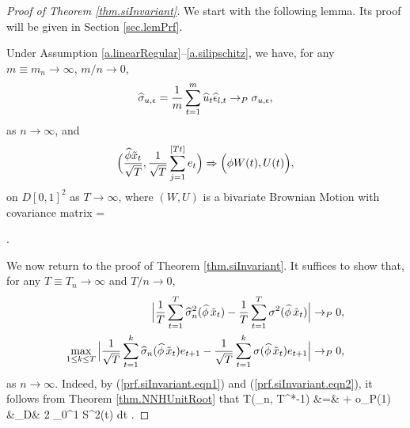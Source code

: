 \begin{proof}[Proof of Theorem \ref {thm.siInvariant}] 

We start with the following lemma. Its proof will be given in Section \ref{sec.lemPrf}.
\begin{lem} 
Under Assumption \ref{a.linearRegular}--\ref{a.silipschitz}, we have, for any $m \equiv m_n\to \infty$, $m / n \to 0$,
\begin{equation}\la{prop.covConsistent.eqn1}
\widehat{\si}_{u, \ep} = \frac{1}{m} \sum_{t = 1}^m \widehat{u}_t \widehat{\ep}_{l,t} \rightarrow_P \si_{u, \ep},
\end{equation}
as $n \to \infty$, and
\begin{equation}\la{prop.covConsistent.eqn2}
\Big ( \frac{\widehat{\phi}\tilde{x}_t}{\sqrt{T}}, \frac{1}{ \sqrt{T}} \sum_{j = 1}^{[Tt]} e_t \Big) \Rightarrow \Big(\phi W(t), U(t) \Big ),
\end{equation}
on $D[0,1]^2$ as $T \to \infty$, where $(W,U)$ is a bivariate Brownian Motion with covariance matrix
\be
\Delta = .
\ee
\end{lem}


We now return to the proof of Theorem \ref {thm.siInvariant}.
It suffices to show that, for any $T \equiv T_n \to \infty$ and $T / n \to 0$,
\begin{align}
\la{prf.siInvariant.eqn1} \Big | \frac{1}{T}\sum_{t=1}^T \widehat{\si}_n^2(\widehat\phi\, \tilde{x}_{t}) - \frac{1}{T} \sum_{t=1}^T \si^2(\widehat{\phi}\,\tilde{x}_{t}) \Big |& \rightarrow_P 0,  \\
\la{prf.siInvariant.eqn2} \max_{1 \le k \le T} \Big | \frac{1}{\sqrt{T}}\sum_{t=1}^k \widehat{\si}_n(\widehat\phi\, \tilde{x}_{t})e_{t+1} - \frac{1}{\sqrt{T}} \sum_{t=1}^k \si(\widehat{\phi}\,\tilde{x}_{t}) e_{t+1}\Big |& \rightarrow_P 0,
\end{align}
as $n \to \infty$. Indeed, by (\ref {prf.siInvariant.eqn1}) and (\ref {prf.siInvariant.eqn2}), it follows from Theorem \ref{thm.NNHUnitRoot} that
\bestar
T(\widehat \al_{n, T}^*-1) &=&  + o_P(1) \no\\
&\rightarrow_D&  { 2 \int_{0}^{1} S^2(t) dt }.
\eestar


\end{proof}
